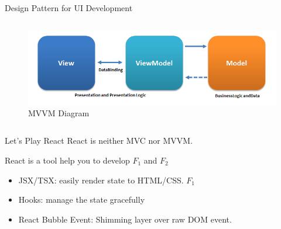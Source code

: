 \begin{frame}{Design Pattern for UI Development}
\begin{columns}
\begin{column}{.7\textwidth}
\begin{figure}
                \includegraphics[width=\textwidth]{assets/MVVM.png}
                \caption{MVVM Diagram }
            \end{figure}
        \end{column}
    \end{columns}
\end{frame}

\begin{frame}{Let's Play React}
    React is neither MVC nor MVVM.
 
    \pause 
    React is a tool help you to develop $F_1$ and $F_2$
    \begin{itemize}
        \item JSX/TSX:  easily render state to HTML/CSS. $F_1$
        \item Hooks: manage the state gracefully 
        \item React Bubble Event: Shimming layer over raw DOM event.
    \end{itemize}


\end{frame}